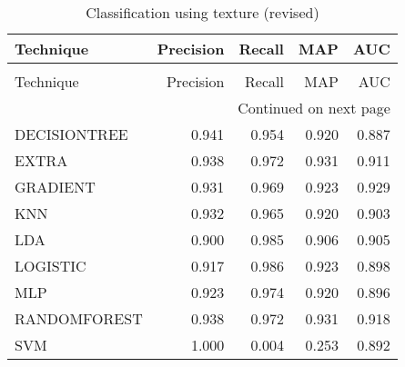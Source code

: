 \begin{longtable}{lrrrr}
\caption[Classification using texture (revised)]{Classification using texture (revised)}
\label{table:texture-auc}\\
\toprule
   Technique &  Precision &  Recall &   MAP &   AUC \\
\midrule
\endfirsthead
\caption[]{Classification using texture (revised)} \\
\toprule
   Technique &  Precision &  Recall &   MAP &   AUC \\
\midrule
\endhead
\midrule
\multicolumn{5}{r}{{Continued on next page}} \\
\midrule
\endfoot

\bottomrule
\endlastfoot
DECISIONTREE &      0.941 &   0.954 & 0.920 & 0.887 \\
       EXTRA &      0.938 &   0.972 & 0.931 & 0.911 \\
    GRADIENT &      0.931 &   0.969 & 0.923 & 0.929 \\
         KNN &      0.932 &   0.965 & 0.920 & 0.903 \\
         LDA &      0.900 &   0.985 & 0.906 & 0.905 \\
    LOGISTIC &      0.917 &   0.986 & 0.923 & 0.898 \\
         MLP &      0.923 &   0.974 & 0.920 & 0.896 \\
RANDOMFOREST &      0.938 &   0.972 & 0.931 & 0.918 \\
         SVM &      1.000 &   0.004 & 0.253 & 0.892 \\
\end{longtable}
